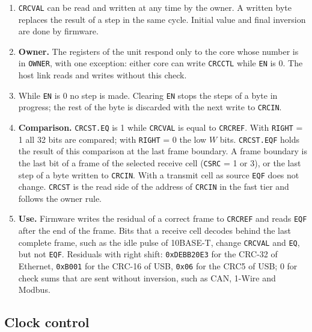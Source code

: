 \documentclass[10pt,a4paper]{article}
\newcommand{\reg}[1]{\texttt{#1}}
\begin{document}
\begin{enumerate}[label=\textbf{F\arabic*},leftmargin=2.6em]
for \reg{BUSY} = 0. The steps run on the source clock, not on the peripheral clock.
\item \reg{CRCVAL} can be read and written at any time by the owner. A written byte replaces the result of a
step in the same cycle. Initial value and final inversion are done by firmware.
\item \textbf{Owner.} The registers of the unit respond only to the core whose number is in \reg{OWNER}, with one
exception: either core can write \reg{CRCCTL} while \reg{EN} is 0. The host link reads and writes without
this check.
\item While \reg{EN} is 0 no step is made. Clearing \reg{EN} stops the steps of a byte in progress; the rest of
the byte is discarded with the next write to \reg{CRCIN}.
\item \textbf{Comparison.} \reg{CRCST.EQ} is 1 while \reg{CRCVAL} is equal to \reg{CRCREF}. With \reg{RIGHT} = 1 all 32
bits are compared; with \reg{RIGHT} = 0 the low $W$ bits. \reg{CRCST.EQF} holds the result of this comparison at
the last frame boundary. A frame boundary is the last bit of a frame of the selected receive cell
(\reg{CSRC} = 1 or 3), or the last step of a byte written to \reg{CRCIN}. With a transmit cell as source
\reg{EQF} does not change. \reg{CRCST} is the read side of the address of \reg{CRCIN} in the fast tier and
follows the owner rule.
\item \textbf{Use.} Firmware writes the residual of a correct frame to \reg{CRCREF} and reads \reg{EQF} after the
end of the frame. Bits that a receive cell decodes behind the last complete frame, such as the idle pulse of
10BASE-T, change \reg{CRCVAL} and \reg{EQ}, but not \reg{EQF}. Residuals with right shift: \texttt{0xDEBB20E3}
for the CRC-32 of Ethernet, \texttt{0xB001} for the CRC-16 of USB, \texttt{0x06} for the CRC5 of USB; 0 for
check sums that are sent without inversion, such as CAN, 1-Wire and Modbus.
\end{enumerate}

\subsection{Clock control}
\end{document}
